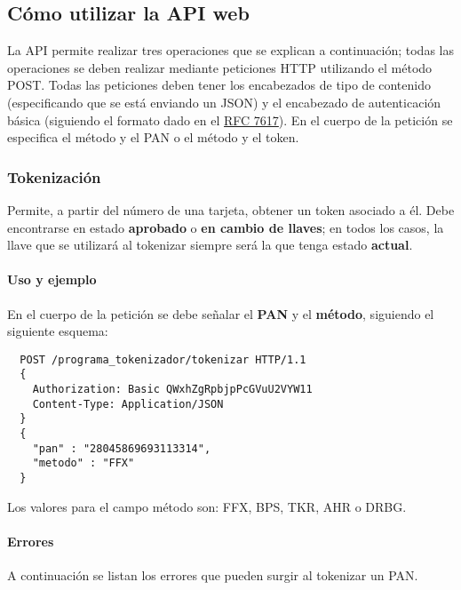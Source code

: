 %
%

\subsection{Cómo utilizar la API web}

La API permite realizar tres operaciones que se explican a continuación;
todas las operaciones se deben realizar mediante peticiones HTTP utilizando
el método POST. Todas las peticiones deben tener los encabezados de tipo de
contenido (especificando que se está enviando un JSON) y el encabezado de
autenticación básica (siguiendo el formato dado en el
\href{https://tools.ietf.org/html/rfc7617}{RFC 7617}). En el cuerpo de
la petición se especifica el método y el PAN o el método y el token.

\subsubsection{Tokenización}

Permite, a partir del número de una tarjeta, obtener un token asociado a
él. Debe encontrarse en estado \textbf{aprobado} o \textbf{en cambio de
llaves}; en todos los casos, la llave que se utilizará al tokenizar
siempre será la que tenga estado \textbf{actual}.

\paragraph{Uso y ejemplo}

En el cuerpo de la petición se debe señalar el \textbf{PAN} y el
\textbf{método}, siguiendo el siguiente esquema:

\begin{verbatim}
  POST /programa_tokenizador/tokenizar HTTP/1.1
  {
    Authorization: Basic QWxhZgRpbjpPcGVuU2VYW11
    Content-Type: Application/JSON
  }
  {
    "pan" : "28045869693113314",
    "metodo" : "FFX"
  }
\end{verbatim}

Los valores para el campo método son: FFX, BPS, TKR, AHR o DRBG.

\paragraph{Errores}

A continuación se listan los errores que pueden surgir al tokenizar un PAN.

